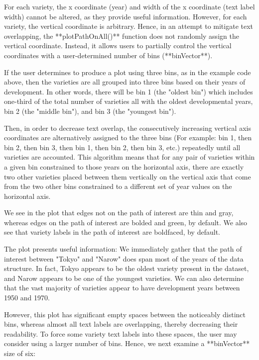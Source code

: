 \documentclass{article}
\numberwithin{equation}{section} %
\begin{document}
For each variety, the x coordinate (year) and width of the x coordinate (text label width) cannot be altered, as they provide useful information. However, for each variety, the vertical coordinate is arbitrary. Hence, in an attempt to mitigate text overlapping, the **plotPathOnAll()** function does not randomly assign the vertical coordinate. Instead, it allows users to partially control the vertical coordinates with a user-determined number of bins (**binVector**).

If the user determines to produce a plot using three bins, as in the example code above, then the varieties are all grouped into three bins based on their years of development. In other words, there will be bin 1 (the "oldest bin") which includes one-third of the total number of varieties all with the oldest developmental years, bin 2 (the "middle bin"), and bin 3 (the "youngest bin").

Then, in order to decrease text overlap, the consecutively increasing vertical axis coordinates are alternatively assigned to the three bins (For example: bin 1, then bin 2, then bin 3, then bin 1, then bin 2, then bin 3, etc.) repeatedly until all varieties are accounted. This algorithm means that for any pair of varieties within a given bin constrained to those years on the horizontal axis, there are exactly two other varieties placed between them vertically on the vertical axis that come from the two other bins constrained to a different set of year values on the horizontal axis.

We see in the plot that edges not on the path of interest are thin and gray, whereas edges on the path of interest are bolded and green, by default. We also see that variety labels in the path of interest are boldfaced, by default.

The plot presents useful information: We immediately gather that the path of interest between "Tokyo" and "Narow" does span most of the years of the data structure. In fact, Tokyo appears to be the oldest variety present in the dataset, and Narow appears to be one of the youngest varieties. We can also determine that the vast majority of varieties appear to have development years between 1950 and 1970.

However, this plot has significant empty spaces between the noticeably distinct bins, whereas almost all text labels are overlapping, thereby decreasing their readability. To force some variety text labels into these spaces, the user may consider using a larger number of bins. Hence, we next examine a **binVector** size of six:
\end{document}
